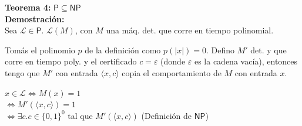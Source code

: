 \documentclass{article}
\begin{document}
\pagebreak

\begin{flushleft}
  \textbf{Teorema 4:}
  $\mathsf{P} \subseteq \mathsf{NP}$ \\[0.5em]

  \textbf{\textcolor{Mulberry}{Demostración:}} \\[0.5em]

  Sea $\mathcal{L} \in \mathsf{P}$. $\mathcal{L}(M)$, con $M$ una máq. det. que corre en tiempo 
  polinomial.

  Tomás el polinomio $p$ de la definición como $p(|x|) = 0$. Defino $M'$ det. y que corre en tiempo poly.
  y el certificado $c = \varepsilon$ (donde $\varepsilon$ es la cadena vacía), entonces tengo que $M'$ con 
  entrada $\langle x,c \rangle$ copia el comportamiento de $M$ con entrada $x$.
\end{flushleft}

\begin{center}
  $x \in \mathcal{L} \iff M(x) = 1$  \\
  $\iff M'(\langle x,c \rangle) = 1$  \\
  $\iff \exists c. c\in \{0,1\}^0$ tal que $M'(\langle x,c \rangle)$ (Definición de $\mathsf{NP}$)
\end{center}
\end{document}
